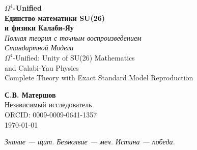 \documentclass[12pt,a4paper,twoside]{article}
\theoremstyle{definition}
\begin{document}
\begin{titlepage}
\centering
\vspace*{0.5cm}


\vspace{0.8cm}

\begin{tcolorbox}[
  enhanced,
  colback=white,
  colframe=deepblue,
  boxrule=1.2pt,
  arc=6pt,
  left=14pt, right=14pt, top=14pt, bottom=14pt
]
\centering
{\Huge\bfseries\color{deepblue} $\Omega^4$-Unified}\\[0.3cm]
{\LARGE\bfseries Единство математики SU(26)\\[0.15cm] и физики Калаби-Яу}\\[0.5cm]
{\large\itshape Полная теория с точным воспроизведением\\[0.1cm] Стандартной Модели}\\[0.4cm]
{\small\color{midgray} $\Omega^4$-Unified: Unity of SU(26) Mathematics\\[0.1cm] and Calabi-Yau Physics}\\[0.1cm]
{\small\color{midgray} Complete Theory with Exact Standard Model Reproduction}
\end{tcolorbox}

\vspace{1.2cm}

{\Large\bfseries\color{deepgray} С.В. Матершов}\\[0.3cm]
{\normalsize Независимый исследователь}\\[0.15cm]
{\small\color{midgray} ORCID: 0009-0009-0641-1357}\\[0.15cm]
{\small\color{midgray} \today}

\vfill

\begin{tcolorbox}[
  enhanced,
  colback=lightgray,
  colframe=gold,
  boxrule=0.6pt,
  arc=3pt,
  width=0.85\textwidth,
  center
]
\centering\small\itshape\color{deepgray}
Знание — щит. Безмолвие — меч. Истина — победа.
\end{tcolorbox}

\vspace{0.5cm}

\end{titlepage}
\end{document}
